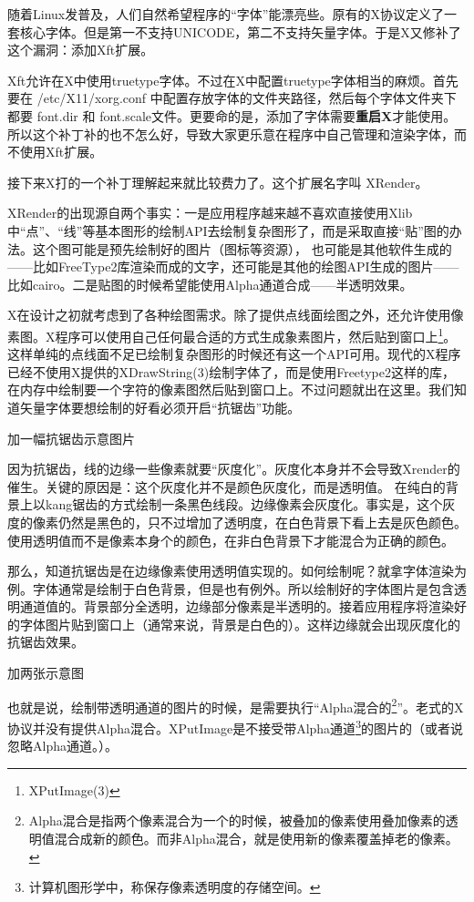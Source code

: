 随着Linux发普及，人们自然希望程序的“字体”能漂亮些。原有的X协议定义了一套核心字体。但是第一不支持UNICODE，第二不支持矢量字体。于是X又修补了这个漏洞：添加Xft扩展。

Xft允许在X中使用truetype字体。不过在X中配置truetype字体相当的麻烦。首先要在 /etc/X11/xorg.conf 中配置存放字体的文件夹路径，然后每个字体文件夹下都要 font.dir 和 font.scale文件。更要命的是，添加了字体需要\textbf{重启X}才能使用。所以这个补丁补的也不怎么好，导致大家更乐意在程序中自己管理和渲染字体，而不使用Xft扩展。

接下来X打的一个补丁理解起来就比较费力了。这个扩展名字叫 XRender。

XRender的出现源自两个事实：一是应用程序越来越不喜欢直接使用Xlib中“点”、“线”等基本图形的绘制API去绘制复杂图形了，而是采取直接“贴”图的办法。这个图可能是预先绘制好的图片（图标等资源），
也可能是其他软件生成的——比如FreeType2库渲染而成的文字，还可能是其他的绘图API生成的图片——比如cairo。二是贴图的时候希望能使用Alpha通道合成——半透明效果。

X在设计之初就考虑到了各种绘图需求。除了提供点线面绘图之外，还允许使用像素图。X程序可以使用自己任何最合适的方式生成象素图片，然后贴到窗口上\footnote{XPutImage(3)}。
这样单纯的点线面不足已绘制复杂图形的时候还有这一个API可用。现代的X程序已经不使用X提供的XDrawString(3)绘制字体了，而是使用Freetype2这样的库，在内存中绘制要一个字符的像素图然后贴到窗口上。不过问题就出在这里。我们知道矢量字体要想绘制的好看必须开启“抗锯齿”功能。

加一幅抗锯齿示意图片

因为抗锯齿，线的边缘一些像素就要“灰度化”。灰度化本身并不会导致Xrender的催生。关键的原因是：这个灰度化并不是颜色灰度化，而是透明值。
在纯白的背景上以kang锯齿的方式绘制一条黑色线段。边缘像素会灰度化。事实是，这个灰度的像素仍然是黑色的，只不过增加了透明度，在白色背景下看上去是灰色颜色。使用透明值而不是像素本身个的颜色，在非白色背景下才能混合为正确的颜色。

那么，知道抗锯齿是在边缘像素使用透明值实现的。如何绘制呢？就拿字体渲染为例。字体通常是绘制于白色背景，但是也有例外。所以绘制好的字体图片是包含透明通道值的。背景部分全透明，边缘部分像素是半透明的。接着应用程序将渲染好的字体图片贴到窗口上（通常来说，背景是白色的）。这样边缘就会出现灰度化的抗锯齿效果。

加两张示意图

也就是说，绘制带透明通道的图片的时候，是需要执行“Alpha混合的\footnote{Alpha混合是指两个像素混合为一个的时候，被叠加的像素使用叠加像素的透明值混合成新的颜色。而非Alpha混合，就是使用新的像素覆盖掉老的像素。}”。老式的X协议并没有提供Alpha混合。XPutImage是不接受带Alpha通道\footnote{计算机图形学中，称保存像素透明度的存储空间。}的图片的（或者说忽略Alpha通道。）。

